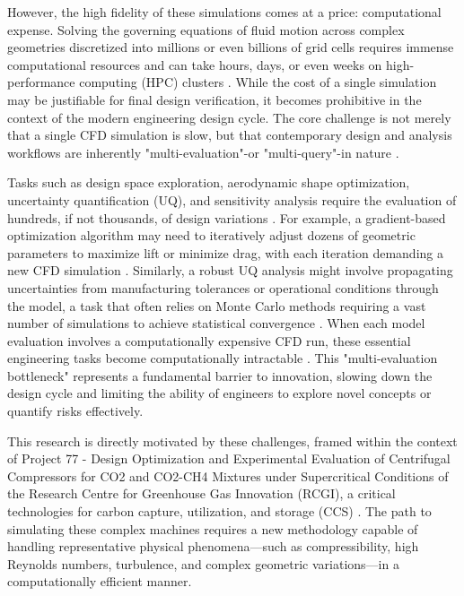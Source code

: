 \documentclass[dsc, EN]{ufabcFHZh}
\begin{document}
However, the high fidelity of these simulations comes at a price: computational expense. Solving the governing equations of fluid motion across complex geometries discretized into millions or even billions of grid cells requires immense computational resources and can take hours, days, or even weeks on high-performance computing (HPC) clusters \citep{slotnick2014cfd}. While the cost of a single simulation may be justifiable for final design verification, it becomes prohibitive in the context of the modern engineering design cycle. The core challenge is not merely that a single CFD simulation is slow, but that contemporary design and analysis workflows are inherently "multi-evaluation"-or "multi-query"-in nature \citep{Bekemeyer2025}.

Tasks such as design space exploration, aerodynamic shape optimization, uncertainty quantification (UQ), and sensitivity analysis require the evaluation of hundreds, if not thousands, of design variations \citep{Yondo2018}. For example, a gradient-based optimization algorithm may need to iteratively adjust dozens of geometric parameters to maximize lift or minimize drag, with each iteration demanding a new CFD simulation \citep{Kenway2016}. Similarly, a robust UQ analysis might involve propagating uncertainties from manufacturing tolerances or operational conditions through the model, a task that often relies on Monte Carlo methods requiring a vast number of simulations to achieve statistical convergence \citep{Smith2014}. When each model evaluation involves a computationally expensive CFD run, these essential engineering tasks become computationally intractable \citep{slotnick2014cfd}. This "multi-evaluation bottleneck" represents a fundamental barrier to innovation, slowing down the design cycle and limiting the ability of engineers to explore novel concepts or quantify risks effectively.

This research is directly motivated by these challenges, framed within the context of Project 77 - Design Optimization and Experimental Evaluation of Centrifugal Compressors for CO2 and CO2-CH4 Mixtures under Supercritical Conditions of the Research Centre for Greenhouse Gas Innovation (RCGI), a critical technologies for carbon capture, utilization, and storage (CCS) \citep{RCGI_Project77}. The path to simulating these complex machines requires a new methodology capable of handling representative physical phenomena—such as compressibility, high Reynolds numbers, turbulence, and complex geometric variations—in a computationally efficient manner.
\end{document}
